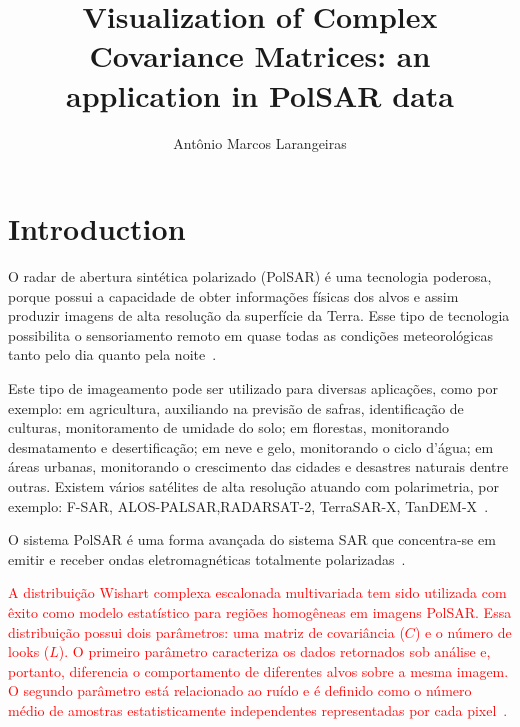 \documentclass[a4paper,12pt]{article}
\title{Visualization of Complex Covariance Matrices: an application in Pol{SAR} data}
\author {Antônio Marcos Larangeiras}
\begin{document}
\maketitle

\begin{abstract}

\end{abstract}

\section{Introduction}

O radar de abertura sintética polarizado (PolSAR) é uma tecnologia poderosa, porque possui a capacidade de obter informações físicas dos alvos e assim produzir imagens de alta resolução da superfície da Terra. Esse tipo de tecnologia possibilita o sensoriamento remoto em quase todas as condições meteorológicas tanto pelo dia quanto pela noite~\citep{zhang-2015,liu-2015}.

Este tipo de imageamento pode ser utilizado para diversas apli\-ca\-ções, como por exemplo: em agricultura, auxiliando na previsão de safras, identificação de culturas, monitoramento de umidade do solo; em florestas, monitorando desmatamento e desertificação; em neve e gelo, monitorando o ciclo d'água; em áreas urbanas, monitorando o crescimento das cidades e desastres naturais dentre outras. Existem vários satélites de alta resolução atuando com polarimetria, por exemplo: F-SAR, ALOS-PALSAR,RADARSAT-2, TerraSAR-X, TanDEM-X~\citep{Meneses,Lee-2009,Chen-Liu-2013,Jagdhuber-2013,Chen-Si-Wei-2013,deledalle-2015,liu-2015,usami-2016}.

O sistema PolSAR é uma forma avançada do sistema SAR que concentra-se em emitir e receber ondas eletromagnéticas totalmente polarizadas~\citep{ma-2015}. 

\textcolor{red}{A distribuição Wishart complexa escalonada multivariada tem sido utilizada com êxito como modelo estatístico para regiões homogêneas em imagens PolSAR. Essa distribuição possui dois parâmetros: uma matriz de covariância ($C$) e o número de looks ($L$). O primeiro parâmetro caracteriza os dados retornados sob análise e, portanto, diferencia o comportamento de diferentes alvos sobre a mesma imagem. O segundo parâmetro está relacionado ao ruído e é definido como o número médio de amostras estatisticamente independentes representadas por cada pixel~\citep{Frery-2013,Nascimento-2014}.}   
\end{document}
